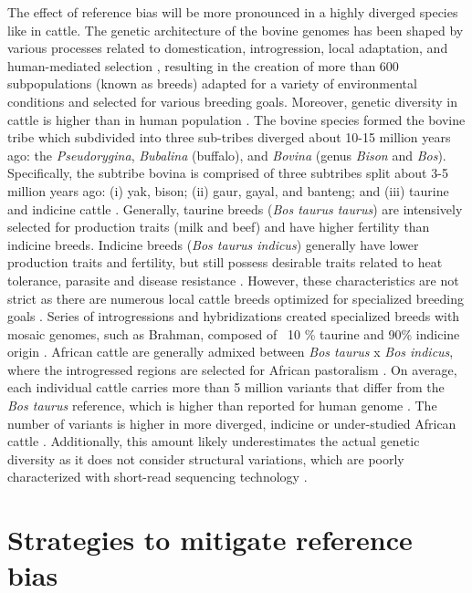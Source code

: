 \documentclass[../main.tex]{subfiles}
\begin{document}
The effect of reference bias will be more pronounced in a highly diverged species like in cattle. The genetic architecture of the bovine genomes has been shaped by various processes related to domestication, introgression, local adaptation, and human-mediated selection \citep{zhang2020evolution}, resulting in the creation of more than 600 subpopulations (known as breeds) adapted for a variety of environmental conditions and selected for various breeding goals. Moreover, genetic diversity in cattle is higher than in human population \citep{charlier2016ngs}. The bovine species formed the bovine tribe which subdivided into three sub-tribes diverged about 10-15 million years ago: the \emph{Pseudorygina}, \emph{Bubalina} (buffalo), and \emph{Bovina} (genus \emph{Bison} and \emph{Bos}). Specifically, the subtribe bovina is comprised of three subtribes split about 3-5 million years ago: (i) yak, bison; (ii) gaur, gayal, and banteng; and (iii) taurine and indicine cattle \citep{pitt2019domestication}. Generally, taurine breeds (\emph{Bos taurus taurus}) are intensively selected for production traits (milk and beef) and have higher fertility than indicine breeds. Indicine breeds (\emph{Bos taurus indicus}) generally have lower production traits and fertility, but still possess desirable traits related to heat tolerance, parasite and disease resistance \citep{Low2020}. However, these characteristics are not strict as there are numerous local cattle breeds optimized for specialized breeding goals \citep{signer2017population,upadhyay2019genomic}. Series of introgressions and hybridizations created specialized breeds with mosaic genomes, such as Brahman, composed of ~10 \% taurine and 90\% indicine origin \citep{koufariotis2018sequencing}. African cattle are generally admixed between \emph{Bos taurus} x \emph{Bos indicus}, where the introgressed regions are selected for African pastoralism \citep{kim2020mosaic}. On average, each individual cattle carries more than 5 million variants that differ from the \emph{Bos taurus} reference, which is higher than reported for human genome \citep{daetwyler2014whole,sudmant2015integrated}. The number of variants is higher in more diverged, indicine \citep{koufariotis2018sequencing} or under-studied African cattle \citep{kim2020mosaic,kim2017genome}. Additionally, this amount likely underestimates the actual genetic diversity as it does not consider structural variations, which are poorly characterized with short-read sequencing technology \citep{mahmoud2019structural,chaisson2019multi}. 

\section{Strategies to mitigate reference bias}
\end{document}
